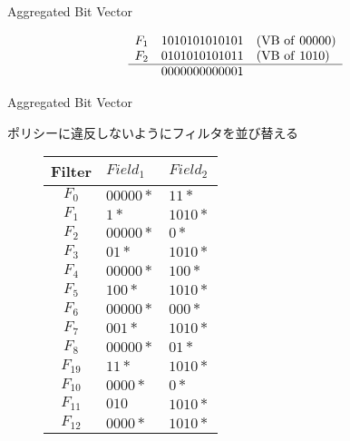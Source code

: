 \documentclass[a4paper,10pt]{jarticle}
\makeatletter
\newcommand{\tblcaption}[1]{\def\@captype{table}\caption{#1}}
\makeatother
\begin{document}
\begin{frame}{Aggregated Bit Vector}
\begin{figure}[h]
\begin{minipage}[c]{.55\textwidth}
   \begin{equation*}
    \begin{array}{lll}
     F_{1} & 1010101010101 & ({\rm VB \ of \ } 00000) \\
     F_{2} & 0101010101011 & ({\rm VB \ of \ } 1010) \\ \hline
           & 0000000000001 &
    \end{array}
   \end{equation*}

  \end{minipage}
\end{figure}

\end{frame}


\begin{frame}{Aggregated Bit Vector}

ポリシーに違反しないようにフィルタを並び替える

\begin{figure}[h]
 \def\@captype{table}
 \begin{minipage}[t]{.4\textwidth}
  {\footnotesize
  {\centering
  \begin{tabular}{c|l|l} 
   Filter   & $Field_{1}$ & $Field_{2}$ \\ \hline
   $F_{0} $ & $00000*$    & $11*$   \\ \hline
   $F_{1} $ & $1*$        & $1010*$  \\ \hline
   $F_{2} $ & $00000*$    & $0*$    \\ \hline
   $F_{3} $ & $01*$       & $1010*$  \\ \hline
   $F_{4} $ & $00000*$    & $100*$   \\ \hline
   $F_{5} $ & $100*$      & $1010*$  \\ \hline
   $F_{6} $ & $00000*$    & $000*$  \\ \hline
   $F_{7} $ & $001*$      & $1010*$  \\ \hline
   $F_{8} $ & $00000*$    & $01*$   \\ \hline
   $F_{19} $ & $11*$      & $1010*$  \\ \hline
   $F_{10} $ & $0000*$    & $0*$   \\ \hline
   $F_{11} $ & $010$      & $1010*$  \\ \hline
   $F_{12} $ & $0000*$    & $1010*$   
  \end{tabular}

}}
\end{minipage}
\end{figure}
\end{frame}
\end{document}
